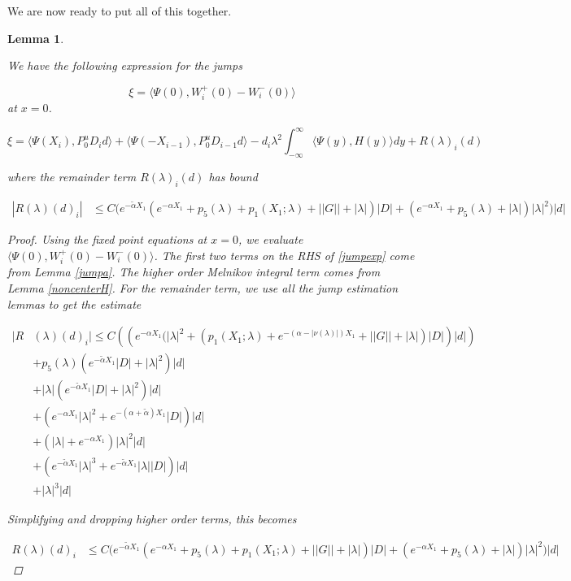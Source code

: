 \documentclass[12pt]{article}
\newtheorem{lemma}{Lemma}
\begin{document}
We are now ready to put all of this together.


\begin{lemma}\label{jump}

We have the following expression for the jumps 

\[
\xi = \langle \Psi(0), W_i^+(0) - W_i^-(0) \rangle
\]
at $x = 0$.

\begin{equation}\label{jumpexp}
\xi = \langle \Psi(X_i), P^u_0 D_i d \rangle + \langle \Psi(-X_{i-1}), P^u_0 D_{i-1} d \rangle - d_i \lambda^2 \int_{-\infty}^\infty \langle \Psi(y), H(y) \rangle dy + R(\lambda)_i(d)
\end{equation}

where the remainder term $R(\lambda)_i(d)$ has bound

\begin{align*}
|R(\lambda)(d)_i| &\leq C \Big( e^{-\tilde{\alpha}X_1}( e^{-\alpha X_1} + p_5(\lambda) 
+ p_1(X_1; \lambda) + ||G|| + |\lambda|  ) |D| 
+ (e^{-\alpha X_1} + p_5(\lambda) + |\lambda| ) |\lambda|^2 \Big) |d|
\end{align*}

\begin{proof}
Using the fixed point equations at $x = 0$, we evaluate $\langle \Psi(0), W_i^+(0) - W_i^-(0) \rangle$. The first two terms on the RHS of \eqref{jumpexp} come from Lemma \ref{jumpa}. The higher order Melnikov integral term comes from Lemma \ref{noncenterH}. For the remainder term, we use all the jump estimation lemmas to get the estimate

\begin{align*}
|R&(\lambda)(d)_i| \leq C ( (e^{-\alpha X_1} \Big( |\lambda|^2  + (p_1(X_1; \lambda) + e^{-(\alpha - |\nu(\lambda)|) X_1} + ||G|| + |\lambda|)|D| ) |d| ) \\
&+ p_5(\lambda) ( e^{-\tilde{\alpha} X_1} |D| + |\lambda|^2 )|d| \\
&+ |\lambda| ( e^{-\tilde{\alpha} X_1} |D| + |\lambda|^2 )|d| \\
&+ ( e^{-\alpha X_1} |\lambda|^2 + e^{-(\alpha + \tilde{\alpha}) X_1} |D|) |d| \\
&+ ( |\lambda| + e^{-\alpha X_1} ) |\lambda|^2 |d| \\
&+ ( e^{-\tilde{\alpha} X_1} |\lambda|^3 + e^{-\tilde{\alpha} X_1} |\lambda| |D|) |d| \\
&+ |\lambda|^3 |d|
\end{align*}

Simplifying and dropping higher order terms, this becomes

\begin{align*}
R(\lambda)(d)_i &\leq C \Big( e^{-\tilde{\alpha}X_1}( e^{-\alpha X_1} + p_5(\lambda)
+ p_1(X_1; \lambda) + ||G|| + |\lambda|  ) |D| 
+ (e^{-\alpha X_1} + p_5(\lambda) + |\lambda| ) |\lambda|^2 \Big) |d|
\end{align*}

\end{proof}
\end{lemma}
\end{document}
